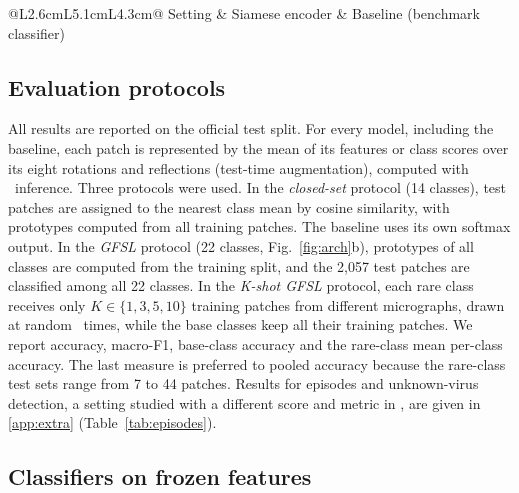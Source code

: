 \documentclass[preprint,review,12pt]{elsarticle}
\begin{document}
\begin{table}[t]
\centering\footnotesize
\caption{Training settings of the Siamese encoder and the baseline, read from the run configurations; they are identical for the three seeds of each model.}
\label{tab:config}
\begin{tabular}{@{}L{2.6cm}L{5.1cm}L{4.3cm}@{}}
\toprule
Setting & Siamese encoder & Baseline (benchmark classifier) \\
\midrule
\TabConfigRows
\bottomrule
\end{tabular}
\end{table}

\subsection{Evaluation protocols}
\label{sec:protocols}

All results are reported on the official test split. For every model, including the baseline, each patch is represented by the mean of its features or class scores over its eight rotations and reflections (test-time augmentation), computed with \InferenceMode\ inference. Three protocols were used. In the \emph{closed-set} protocol (14 classes), test patches are assigned to the nearest class mean by cosine similarity, with prototypes computed from all training patches. The baseline uses its own softmax output. In the \emph{GFSL} protocol (22 classes, Fig.~\ref{fig:arch}b), prototypes of all classes are computed from the training split, and the 2,057 test patches are classified among all 22 classes. In the \emph{K-shot GFSL} protocol, each rare class receives only $K\in\{1,3,5,10\}$ training patches from different micrographs, drawn at random \KshotDraws\ times, while the base classes keep all their training patches. We report accuracy, macro-F1, base-class accuracy and the rare-class mean per-class accuracy. The last measure is preferred to pooled accuracy because the rare-class test sets range from 7 to 44 patches. Results for episodes and unknown-virus detection, a setting studied with a different score and metric in \cite{MS22}, are given in \ref{app:extra} (Table~\ref{tab:episodes}).

\subsection{Classifiers on frozen features}
\label{sec:classifiers}
\end{document}
